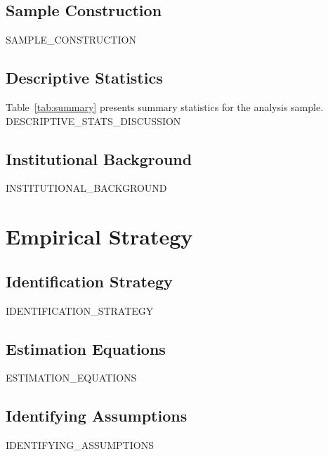 \subsection{Sample Construction}
{{SAMPLE_CONSTRUCTION}}

\subsection{Descriptive Statistics}
Table~\ref{tab:summary} presents summary statistics for the analysis sample.
{{DESCRIPTIVE_STATS_DISCUSSION}}

\subsection{Institutional Background}
{{INSTITUTIONAL_BACKGROUND}}


\section{Empirical Strategy}
\label{sec:strategy}

\subsection{Identification Strategy}
{{IDENTIFICATION_STRATEGY}}

\subsection{Estimation Equations}
{{ESTIMATION_EQUATIONS}}

\subsection{Identifying Assumptions}
{{IDENTIFYING_ASSUMPTIONS}}

